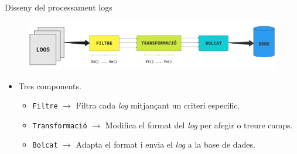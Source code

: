 \begin{frame}{Disseny del processament logs}

    \begin{figure}
        \includegraphics[width=\textwidth]{figures/log-processing}\label{fig:log-processing}
    \end{figure}

    \begin{itemize}[<+- | alert@+>]
        \item Tres components.
        \begin{itemize}[<+- | alert@+>]
            \item \texttt{Filtre} \(\rightarrow\) Filtra cada \textit{log} mitjançant un criteri específic.
            \item \texttt{Transformació} \(\rightarrow\) Modifica el format del \textit{log} per afegir o treure camps.
            \item \texttt{Bolcat} \(\rightarrow\) Adapta el format i envia el \textit{log} a la base de dades.
        \end{itemize}
    \end{itemize}
\end{frame}